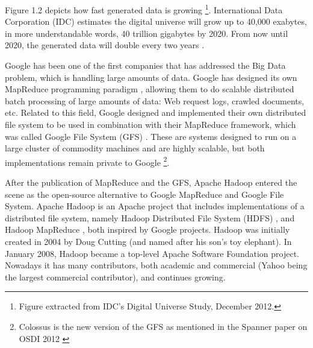 Figure 1.2 depicts how fast generated data is growing  \footnote{Figure extracted from IDC's Digital Universe Study, December 2012.}. International Data Corporation (IDC) estimates the digital universe will grow up to 40,000 exabytes, in more understandable words, 40 trillion gigabytes by 2020. From now until 2020, the generated data will double every two years \cite{gantz2012digital}.
\par
Google has been one of the first companies that has addressed the Big Data problem, which is handling large amounts of data. Google has designed its own MapReduce programming paradigm \cite{dean2008mapreduce}, allowing them to do scalable distributed batch processing of large amounts of data: Web request logs, crawled documents, etc. Related to this field, Google designed and implemented their own distributed file system to be used in combination with their MapReduce framework, which was called Google File System (GFS) \cite{ghemawat2003google}. These are systems designed to run on a large cluster of commodity machines and are highly scalable, but both implementations remain private to Google \footnote{Colossus is the new version of the GFS as mentioned in the Spanner paper on OSDI 2012 \cite{corbettspanner}}.
\par
After the publication of MapReduce and the GFS, Apache Hadoop \cite{ApacheHadoop} entered the scene as the open-source alternative to Google MapReduce and Google File System. Apache Hadoop is an Apache project that includes implementations of a distributed file system, namely Hadoop Distributed File System (HDFS)  \cite{white2012hadoop, shvachko2010hadoop}, and Hadoop MapReduce \cite{ApacheHadoop}, both inspired by Google projects. Hadoop was initially created in 2004 by Doug Cutting (and named after his son's toy elephant). In January 2008, Hadoop became a top-level Apache Software Foundation project. Nowadays it has many contributors, both academic and commercial (Yahoo being the largest commercial contributor), and continues growing.
\par
